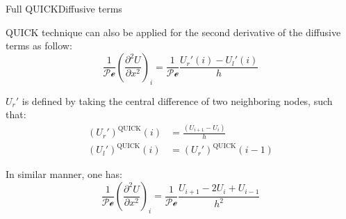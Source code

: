 \documentclass[aspectratio=169, sectionpages, codemintedoverleaf, bibref]{beamer}
\begin{document}
\begin{frame}{Full QUICK}{Diffusive terms}
    
    QUICK technique can also be applied for the second derivative of the diffusive terms as follow: \begin{equation}
	    \frac{1}{\mathcal{Pe}} \left( \frac{\partial^2 U}{\partial x^2} \right)_i = \frac{1}{\mathcal{Pe}} \frac{U_r' (i) - U_l' (i)}{h}
        \label{eq:quickd}
	\end{equation}

    $U_r'$ is defined by taking the central difference of two neighboring nodes, such that: \begin{align}
        \left( U_r' \right)^{\text{QUICK}} (i) &= \frac{\left( U_{i+1} - U_i \right)}{h} \\
        \left( U_l' \right)^{\text{QUICK}} (i) &= \left( U_r' \right)^{\text{QUICK}} (i-1)
    \end{align}

    In similar manner, one has: \begin{equation}
        \frac{1}{\mathcal{Pe}} \left( \frac{\partial^2 U}{\partial x^2} \right)_i = \frac{1}{\mathcal{Pe}} \frac{ U_{i+1} - 2 U_i + U_{i-1} }{h^2}
    \end{equation}
    
\end{frame}
\end{document}
